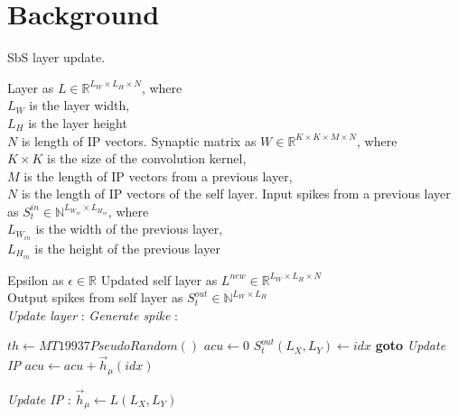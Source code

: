 \section{Background}
\label{sec:background}



\begin{algorithm}
\caption{SbS layer update.}

\begin{algorithmic}[1]
	\SetAlgoLined
	\renewcommand{\algorithmicrequire}{\textbf{input:}}
	\renewcommand{\algorithmicensure}{\textbf{output:}}
	\REQUIRE Layer as $L\in\mathbb{R}^{L_W \times L_H \times N}$, where\\
	$L_W$ is the layer width,\\
	$L_H$ is the layer height\\
	$N$ is length of IP vectors.
	\REQUIRE Synaptic matrix as $W\in\mathbb{R}^{K\times K\times M\times N}$, where\\
	$K \times K$ is the size of the convolution kernel, \\
	$M$ is the length of IP vectors from a previous layer,\\
	$N$ is the length of IP vectors of the self layer.  
	\REQUIRE Input spikes from a previous layer as $S_t^{in}\in\mathbb{N}^{ L_{W_{in}} \times L_{H_{in}}}$, where\\
	$L_{W_{in}}$ is the width of the previous layer,\\
	$L_{H_{in}}$ is the height of the previous layer
	
	\REQUIRE Epsilon as $\epsilon\in\mathbb{R}$
	\ENSURE Updated self layer as $L^{new}\in\mathbb{R}^{L_W\times L_H \times N}$\\
	\ENSURE Output spikes from self layer as $S_t^{out} \in\mathbb{N}^{L_W\times L_H}$
	\\
	\textit{Update layer} :
		\textit{Generate spike} :
		
		\STATE $th \leftarrow MT19937PseudoRandom()$
		\STATE $acu \leftarrow 0$
				\STATE $S_t^{out}(L_X,L_Y) \leftarrow idx$
				\STATE \textbf{goto} \emph{Update IP}
			\ENDIF
			\STATE $acu \leftarrow acu + \vec{h}_{\mu}(idx)$
		\ENDFOR

		\textit{Update IP} :
		\STATE $\vec{h}_\mu \leftarrow L(L_X,L_Y)$ 
		

\end{algorithmic}
\end{algorithm}

